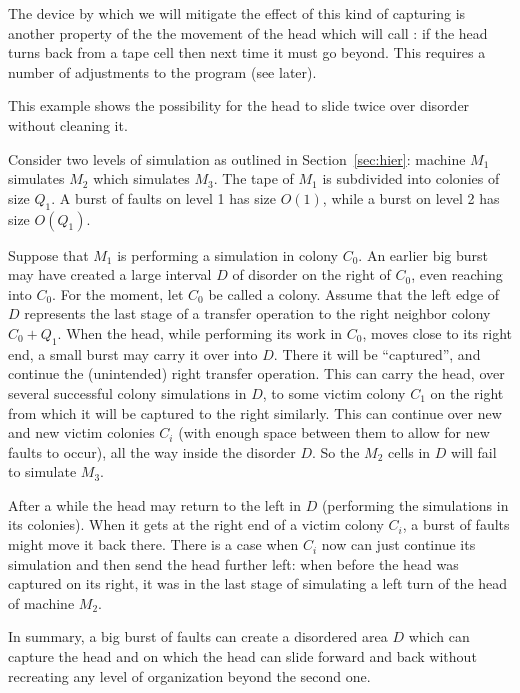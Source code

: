 \documentclass[11pt]{memoir}
\theoremstyle{definition} %
\newcommand{\Q}{Q} %
\begin{document}
The device by which we will mitigate the effect of this kind of capturing is another property of the
the movement of the head which will call :
if the head turns back from a tape cell then next time it must go beyond.
This requires a number of adjustments to the program (see later).

\begin{example}
  This example shows the possibility for the head to slide twice over disorder without cleaning it.
  
Consider two levels of simulation as outlined in Section~\ref{sec:hier}: 
machine \( M_{1} \) simulates \( M_{2} \) which simulates \( M_{3} \).
The tape of \( M_{1} \) is subdivided into colonies of size \( \Q_{1} \).
A burst of faults on level 1 has size \( O(1) \), while a burst on level 2 has size \( O(\Q_{1}) \).

Suppose that \( M_{1} \) is performing a simulation in colony \( C_{0} \).
An earlier big burst may have created a large interval \( D \) of disorder
on the right of \( C_{0} \), even reaching into \( C_{0} \).
For the moment, let \( C_{0} \) be called a  colony.
Assume that the left edge of \( D \) represents the last stage of a transfer operation to the right neighbor 
colony \( C_{0}+Q_{1} \).
When the head, while performing its work in \( C_{0} \), moves close to its right end, a small burst may 
carry it over into \( D \).
There it will be ``captured'', and continue the (unintended) right transfer operation.
This can carry the head, over several successful colony simulations in \( D \), to some
victim colony \( C_{1} \) on the right from which it will be captured to the right similarly.
This can continue over new and new victim colonies \( C_{i} \) (with enough space between them to
allow for new faults to occur), all the way inside the disorder \( D \).
So the \( M_{2} \) cells in \( D \) will fail to simulate \( M_{3} \).

After a while the head may return to the left in \( D \)
(performing the simulations in its colonies).
When it gets at the right end of a victim colony \( C_{i} \), a burst of faults might move it back there.
There is a case when \( C_{i} \) now can just continue its simulation and then send the head
further left: when before the head was captured on its right,
it was in the last stage of simulating a left turn of the head of machine \( M_{2} \).

In summary, a big burst of faults
can create a disordered area \( D \) which can capture the head and on which the head can slide
forward and back without recreating any level of organization beyond the second one.
\end{example}
\end{document}
